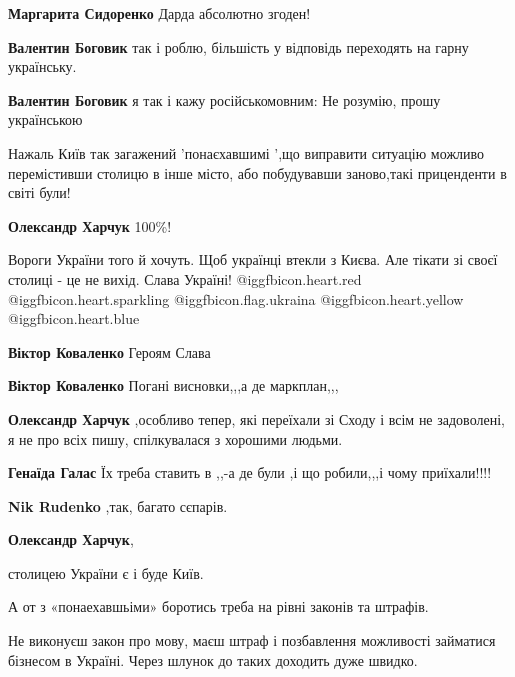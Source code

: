 \begin{itemize}
\begin{itemize}
\begin{itemize} %
\textbf{Маргарита Сидоренко} Дарда абсолютно згоден!
\end{itemize} %

\textbf{Валентин Боговик} так і роблю, більшість у відповідь переходять на гарну українську.

\textbf{Валентин Боговик} я так і кажу російськомовним: Не розумію, прошу українською

\end{itemize} %


Нажаль Київ так загажений 'понаєхавшимі ',що виправити ситуацію можливо
перемістивши столицю в інше місто, або побудувавши заново,такі приценденти в
світі були!

\begin{itemize} %
\textbf{Олександр Харчук} 100\%!

Вороги України того й хочуть. Щоб українці втекли з Києва. Але тікати зі своєї столиці - це не вихід. Слава Україні!  @igg{fbicon.heart.red}  @igg{fbicon.heart.sparkling}  @igg{fbicon.flag.ukraina} @igg{fbicon.heart.yellow}  @igg{fbicon.heart.blue} 

\begin{itemize} %
\textbf{Віктор Коваленко} Героям Слава

\textbf{Віктор Коваленко} Погані висновки,,,а де маркплан,,,
\end{itemize} %

\textbf{Олександр Харчук} ,особливо тепер, які переїхали зі Сходу і всім не
задоволені, я не про всіх пишу, спілкувалася з хорошими людьми.

\begin{itemize} %
\textbf{Генаїда Галас} Їх треба ставить в ,,-а де були ,і що робили,,,і чому приїхали!!!!

\textbf{Nik Rudenko} ,так, багато сєпарів.
\end{itemize} %

\textbf{Олександр Харчук}, 

столицею України є і буде Київ.

А от з «понаехавшьіми» боротись треба на рівні законів та штрафів.

Не виконуєш закон про мову, маєш штраф і позбавлення можливості займатися
бізнесом в Україні. Через шлунок до таких доходить дуже швидко.


\end{itemize}
\end{itemize}
